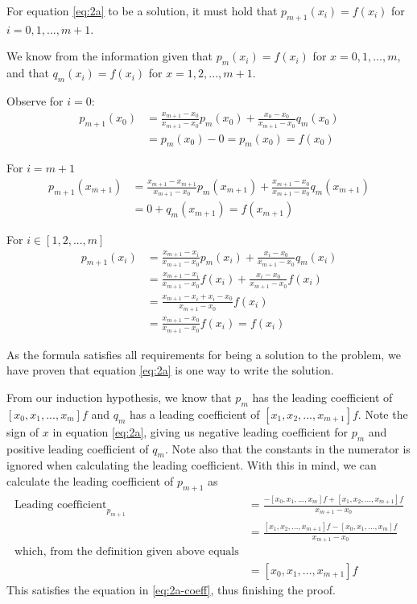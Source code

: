 For equation \eqref{eq:2a} to be a solution, it must hold that $p_{m+1}(x_i) = f(x_i)$ for $i = 0, 1, ..., m+1$.

We know from the information given that $p_m(x_i) = f(x_i)$ for $x = 0, 1, ..., m$, and that $q_m(x_i) = f(x_i)$ for $x = 1, 2, ..., m+1$.

Observe for $i = 0$:
\begin{align*}
    p_{m+1}(x_0) &= \frac{x_{m+1} - x_0}{x_{m+1} - x_0} p_m(x_0) + \frac{x_0 - x_0}{x_{m+1} - x_0} q_m(x_0) \\
    &= p_m(x_0) - 0 = p_m(x_0) = f(x_0)
\end{align*}

For $i = m+1$
\begin{align*}
    p_{m+1}(x_{m+1}) &= \frac{x_{m+1} - x_{m+1}}{x_{m+1} - x_0} p_m(x_{m+1}) + \frac{x_{m+1} - x_0}{x_{m+1} - x_0} q_m(x_{m+1}) \\
    &= 0 + q_m(x_{m+1}) = f(x_{m+1})
\end{align*}

For $i \in [1, 2, ..., m]$
\begin{align*}
    p_{m+1}(x_i) &= \frac{x_{m+1} - x_i}{x_{m+1} - x_0} p_m(x_i) + \frac{x_i - x_0}{x_{m+1} - x_0} q_m(x_i) \\
    &= \frac{x_{m+1} - x_i}{x_{m+1} - x_0} f(x_i) + \frac{x_i - x_0}{x_{m+1} - x_0} f(x_i) \\
    &= \frac{x_{m+1} - x_i + x_i - x_0}{x_{m+1} - x_0} f(x_i) \\
    &= \frac{x_{m+1} - x_0}{x_{m+1} - x_0} f(x_i) = f(x_i)
\end{align*}

As the formula satisfies all requirements for being a solution to the problem, we have proven that equation \eqref{eq:2a} is one way to write the solution.

From our induction hypothesis, we know that $p_m$ has the leading coefficient of $[x_0, x_1, ..., x_m]f$ and $q_m$ has a leading coefficient of $[x_1, x_2, ..., x_{m+1}]f$. Note the sign of $x$ in equation \eqref{eq:2a}, giving us negative leading coefficient for $p_m$ and positive leading coefficient of $q_m$. Note also that the constants in the numerator is ignored when calculating the leading coefficient. With this in mind, we can calculate the leading coefficient of $p_{m+1}$ as
\begin{align*}
    \text{Leading coefficient}_{p_{m+1}} &= \frac{-[x_0, x_1, ..., x_m]f + [x_1, x_2, ..., x_{m+1}]f}{x_{m+1} - x_0} \\
    &= \frac{[x_1, x_2, ..., x_{m+1}]f - [x_0, x_1, ..., x_m]f}{x_{m+1} - x_0} \\
    \text{which, from the definition given above equals} \\
    &= [x_0, x_1, ..., x_{m+1}] f
\end{align*}
This satisfies the equation in \eqref{eq:2a-coeff}, thus finishing the proof.



